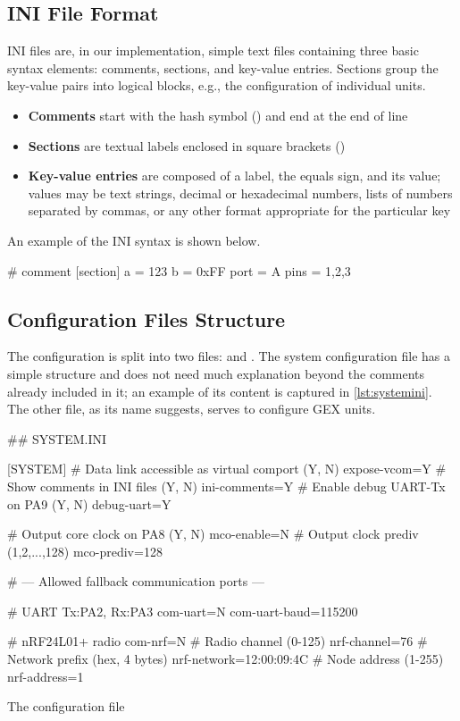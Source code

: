 \subsection{INI File Format}

INI files are, in our implementation, simple text files containing three basic syntax elements: comments, sections, and key-value entries. Sections group the key-value pairs into logical blocks, e.g., the configuration of individual units.

\begin{itemize}	
	\item \textbf{Comments} start with the hash symbol (\mono{\#}) and end at the end of line
	\item \textbf{Sections} are textual labels enclosed in square brackets (\mono{[UNITS]})
	\item \textbf{Key-value entries} are composed of a label, the equals sign, and its value; values may be text strings, decimal or hexadecimal numbers, lists of numbers separated by commas, or any other format appropriate for the particular key
\end{itemize}

\noindent
An example of the INI syntax is shown below.

\begin{inicode}
# comment
[section]
a = 123
b = 0xFF
port = A
pins = 1,2,3
\end{inicode}
	
\subsection{Configuration Files Structure}

The configuration is split into two files:  and . The system configuration file has a simple structure and does not need much explanation beyond the comments already included in it; an example of its content is captured in \cref{lst:systemini}. The other file, as its name suggests, serves to configure GEX units.

\begin{listing}
	\begin{inicode}
		## SYSTEM.INI
		
		[SYSTEM]
		# Data link accessible as virtual comport (Y, N)
		expose-vcom=Y
		# Show comments in INI files (Y, N)
		ini-comments=Y
		# Enable debug UART-Tx on PA9 (Y, N)
		debug-uart=Y
		
		# Output core clock on PA8 (Y, N)
		mco-enable=N
		# Output clock prediv (1,2,...,128)
		mco-prediv=128
		
		# --- Allowed fallback communication ports ---
		
		# UART Tx:PA2, Rx:PA3
		com-uart=N
		com-uart-baud=115200
		
		# nRF24L01+ radio
		com-nrf=N
		# Radio channel (0-125)
		nrf-channel=76
		# Network prefix (hex, 4 bytes)
		nrf-network=12:00:09:4C
		# Node address (1-255)
		nrf-address=1
	\end{inicode}
	\caption{\label{lst:systemini}The  configuration file}
\end{listing}


